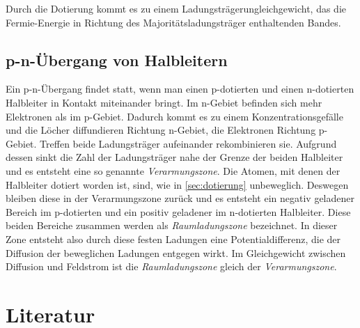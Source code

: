 \documentclass[slug=SZ, room=Hermann-Krone-Bau\,\ Labor\ 1.25, supervisor=Tim\ Ziegler]{../../Lab_Report_LaTeX/lab_report}
\begin{document}
Durch die Dotierung kommt es zu einem Ladungsträgerungleichgewicht, das die Fermie-Energie in Richtung des
Majoritätsladungsträger enthaltenden Bandes.

\subsection{p-n-Übergang von Halbleitern}
\label{sec:pnüber}

Ein p-n-Übergang findet statt, wenn man einen p-dotierten und einen n-dotierten Halbleiter in Kontakt miteinander
bringt. Im n-Gebiet befinden sich mehr Elektronen als im p-Gebiet. Dadurch kommt es zu einem Konzentrationsgefälle
und die Löcher diffundieren Richtung n-Gebiet, die Elektronen Richtung p-Gebiet. Treffen beide Ladungsträger
aufeinander rekombinieren sie. Aufgrund dessen sinkt die Zahl der Ladungsträger nahe der Grenze der beiden
Halbleiter und es entsteht eine so genannte \emph{Verarmungszone}. Die Atomen, mit denen der Halbleiter
dotiert worden ist, sind, wie in \ref{sec:dotierung} unbeweglich. Deswegen bleiben diese in der Verarmungszone
zurück und es entsteht ein negativ geladener Bereich im p-dotierten und ein positiv geladener im
n-dotierten Halbleiter. Diese beiden Bereiche zusammen werden als \emph{Raumladungszone} bezeichnet.
In dieser Zone entsteht also durch diese festen Ladungen eine Potentialdifferenz, die der Diffusion der
beweglichen Ladungen entgegen wirkt. Im Gleichgewicht zwischen Diffusion und Feldstrom ist die 
\emph{Raumladungszone} gleich der \emph{Verarmungszone}.
\section{Literatur}
\label{sec:literatur}

\printbibliography
\end{document}
